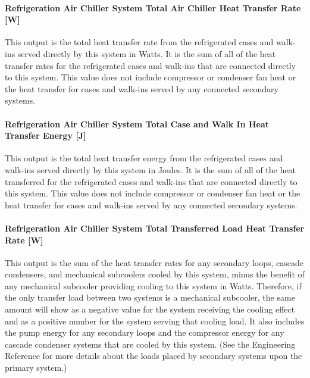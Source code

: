 \paragraph{Refrigeration Air Chiller System Total Air Chiller Heat Transfer Rate {[}W{]}}\label{refrigeration-air-chiller-system-total-air-chiller-heat-transfer-rate-w}

This output is the total heat transfer rate from the refrigerated cases and walk-ins served directly by this system in Watts. It is the sum of all of the heat transfer rates for the refrigerated cases and walk-ins that are connected directly to this system. This value does not include compressor or condenser fan heat or the heat transfer for cases and walk-ins served by any connected secondary systems.

\paragraph{Refrigeration Air Chiller System Total Case and Walk In Heat Transfer Energy {[}J{]}}\label{refrigeration-air-chiller-system-total-case-and-walk-in-heat-transfer-energy-j}

This output is the total heat transfer energy from the refrigerated cases and walk-ins served directly by this system in Joules. It is the sum of all of the heat transferred for the refrigerated cases and walk-ins that are connected directly to this system. This value does not include compressor or condenser fan heat or the heat transfer for cases and walk-ins served by any connected secondary systems.

\paragraph{Refrigeration Air Chiller System Total Transferred Load Heat Transfer Rate {[}W{]}}\label{refrigeration-air-chiller-system-total-transferred-load-heat-transfer-rate-w}

This output is the sum of the heat transfer rates for any secondary loops, cascade condensers, and mechanical subcoolers cooled by this system, minus the benefit of any mechanical subcooler providing cooling to this system in Watts. Therefore, if the only transfer load between two systems is a mechanical subcooler, the same amount will show as a negative value for the system receiving the cooling effect and as a positive number for the system serving that cooling load. It also includes the pump energy for any secondary loops and the compressor energy for any cascade condenser systems that are cooled by this system. (See the Engineering Reference for more details about the loads placed by secondary systems upon the primary system.)

